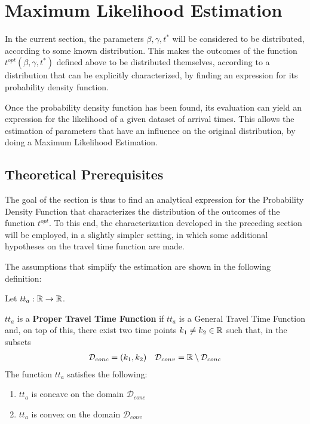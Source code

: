 \section{Maximum Likelihood Estimation}

In the current section,
the parameters \(\beta, \gamma, t^*\) will be considered to be distributed, according to some known distribution.
This makes the outcomes of the function \(t^{opt}(\beta, \gamma, t^*)\) defined above to be distributed themselves,
according to a distribution that can be explicitly characterized,
by finding an expression for its probability density function.

Once the probability density function has been found,
its evaluation can yield an expression for the likelihood of a given dataset of arrival times.
This allows the estimation of parameters that have an influence on the original distribution,
by doing a Maximum Likelihood Estimation.

\subsection{Theoretical Prerequisites}


The goal of the section is thus to find an analytical expression for the Probability Density Function that characterizes the distribution of the outcomes of the function \(t^{opt}\).
To this end, the characterization developed in the preceding section will be employed,
in a slightly simpler setting, in which some additional hypotheses on the travel time function are made.

The assumptions that simplify the estimation are shown in the following definition:
\begin{definition}
  \label{def:proper_tt}
  Let \(tt_a:\mathbb{R}\rightarrow\mathbb{R}\).

  \(tt_a\) is a \textbf{Proper Travel Time Function} if \(tt_a\) is a General Travel Time Function and,
  on top of this, 
  there exist two time points \(k_1 \neq k_2 \in \mathbb{R}\) such that,
  in the subsets
  \begin{align}
    \label{eq:subs_conc_conv}
    \mathcal{D}_{conc} = (k_1, k_2) && \mathcal{D}_{conv} = \mathbb{R} \setminus \mathcal{D}_{conc}
  \end{align}
  The function \(tt_a\) satisfies the following:
  \begin{enumerate}
  \item \(tt_a\) is concave on the domain \(\mathcal{D}_{conc}\)
  \item \(tt_a\) is convex on the domain \(\mathcal{D}_{conv}\)
  \end{enumerate}
\end{definition}

